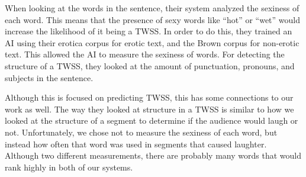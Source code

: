 When looking at the words in the sentence, their system analyzed the sexiness of each word. This means that the presence of sexy words like ``hot'' or ``wet'' would increase the likelihood of it being a TWSS. In order to do this, they trained an AI using their erotica corpus for erotic text, and the Brown corpus for non-erotic text. This allowed the AI to measure the sexiness of words. For detecting the structure of a TWSS, they looked at the amount of punctuation, pronouns, and subjects in the sentence. 

Although this is focused on predicting TWSS, this has some connections to our work as well. The way they looked at structure in a TWSS is similar to how we looked at the structure of a segment to determine if the audience would laugh or not. Unfortunately, we chose not to measure the sexiness of each word, but instead how often that word was used in segments that caused laughter. Although two different measurements, there are probably many words that would rank highly in both of our systems.

